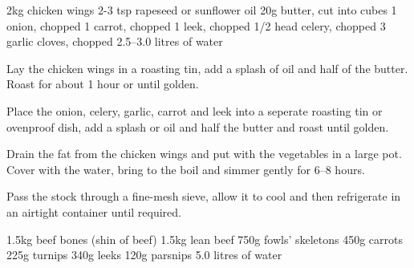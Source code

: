 \label{rec:chicken-stock}
\begin{ingreds}
	2kg chicken wings
     	2-3 tsp rapeseed or sunflower oil
     	20g butter, cut into cubes
     	1 onion, chopped
    	1 carrot, chopped
	1 leek, chopped
	1/2 head celery, chopped
	3 garlic cloves, chopped
	2.5--3.0 litres of water
\end{ingreds}

\begin{method}
    Lay the chicken wings in a roasting tin, add a splash of oil and half of the butter.  Roast for about 1 hour or until golden.

    Place the onion, celery, garlic, carrot and leek into a seperate roasting tin or ovenproof dish, add a splash or oil and half the butter and roast until golden.

   	Drain the fat from the chicken wings and put with the vegetables in a large pot.  Cover with the water, bring to the boil and simmer gently for 6--8 hours.

	Pass the stock through a fine-mesh sieve, allow it to cool and then refrigerate in an airtight container until required.
\end {method}

\label{rec:escoffier-fonds-blanc}
\begin{ingreds}
	1.5kg beef bones (shin of beef)
	1.5kg lean beef
	750g fowls' skeletons
	450g carrots
	225g turnips
	340g leeks
	120g parsnips
	5.0 litres of water
\end{ingreds}

